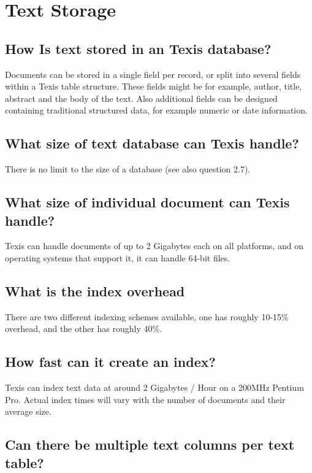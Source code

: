 \section{Text Storage}

\subsection{How Is text stored in an Texis database?}

Documents can be stored in a single field per record, or split into
several fields within a Texis table structure.  These fields might be for
example, author, title, abstract and the body of the text.  Also
additional fields can be designed containing traditional structured data,
for example numeric or date information.

\subsection{What size of text database can Texis handle?}

There is no limit to the size of a database (see also question 2.7).

\subsection{What size of individual document can Texis handle?}

Texis can handle documents of up to 2 Gigabytes each on all platforms,
and on operating systems that support it, it can handle 64-bit files.

\subsection{What is the index overhead}

There are two different indexing schemes available, one has roughly
10-15\% overhead, and the other has roughly 40\%.

\subsection{How fast can it create an index?}

Texis can index text data at around 2 Gigabytes / Hour on a 200MHz Pentium Pro.
Actual index times will vary with the number of documents and their average size.

\subsection{Can there be multiple text columns per text table?}

